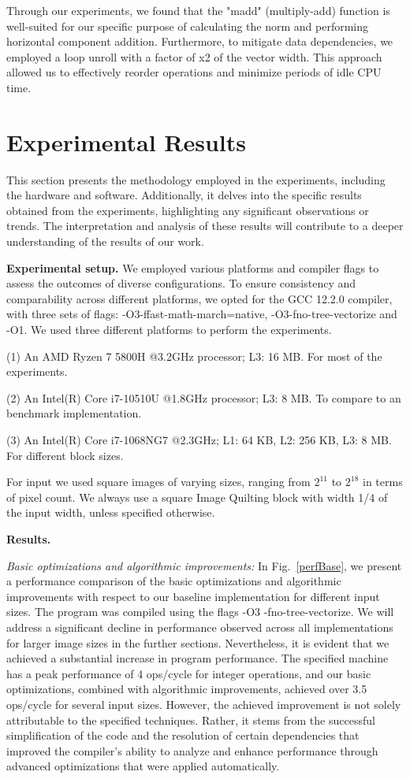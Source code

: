 \documentclass[letterpaper]{article}
\newcommand{\mypar}[1]{{\bf #1.}}
\newcommand{\inline}[1]{{\ttfamily\hyphenchar\font=45 #1}}
\begin{document}
Through our experiments, we found that the "madd" (multiply-add) function is well-suited for our specific purpose of calculating the norm and performing horizontal component addition.
Furthermore, to mitigate data dependencies, we employed a loop unroll with a factor of x2 of the vector width. This approach allowed us to effectively reorder operations and minimize periods of idle CPU time. 

\section{Experimental Results}\label{sec:exp}

This section presents the methodology employed in the experiments, including the hardware and software. Additionally, it delves into the specific results obtained from the experiments, highlighting any significant observations or trends. The interpretation and analysis of these results will contribute to a deeper understanding of the results of our work.

\mypar{Experimental setup} 
We employed various platforms and compiler flags to assess the outcomes of diverse configurations. To ensure consistency and comparability across different platforms, we opted for the GCC 12.2.0 compiler, with three sets of flags: \inline{-O3-ffast-math-march=native}, \inline{-O3-fno-tree-vectorize} and \inline{-O1}. We used three different platforms to perform the experiments.

(1) An AMD Ryzen 7 5800H @3.2GHz processor; L3: 16 MB. For most of the experiments.

(2) An Intel(R) Core i7-10510U @1.8GHz processor; L3: 8 MB. To compare to an benchmark implementation.

(3) An Intel(R) Core i7-1068NG7 @2.3GHz; L1: 64 KB, L2: 256 KB, L3: 8 MB. For different block sizes.

For input we used square images of varying sizes, ranging from $2^{11}$ to $2^{18}$ in terms of pixel count. We always use a square Image Quilting block with width 1/4 of the input width, unless specified otherwise.

\mypar{Results}

\textit{Basic optimizations and algorithmic improvements:} In Fig.~\ref{perfBase}, we present a performance comparison of the basic optimizations and algorithmic improvements with respect to our baseline implementation for different input sizes. The program was compiled using the flags \inline{-O3 -fno-tree-vectorize}. We will address a significant decline in performance observed across all implementations for larger image sizes in the further sections. Nevertheless, it is evident that we achieved a substantial increase in program performance. The specified machine has a peak performance of 4 ops/cycle for integer operations, and our basic optimizations, combined with algorithmic improvements, achieved over 3.5 ops/cycle for several input sizes. However, the achieved improvement is not solely attributable to the specified techniques. Rather, it stems from the successful simplification of the code and the resolution of certain dependencies that improved the compiler's ability to analyze and enhance performance through advanced optimizations that were applied automatically.
\end{document}
